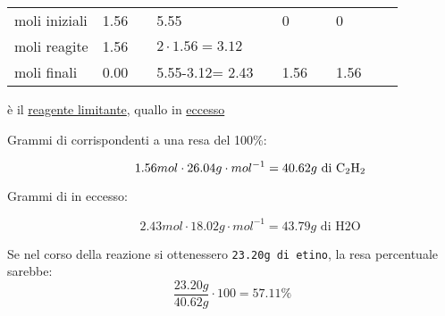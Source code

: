 \begin{ess}
\begin{tabular}[ht!]{llllllllll}
    moli iniziali & 1.56 && 5.55 && 0 && 0\\
    moli reagite & 1.56 && $2\cdot 1.56 = 3.12$\\
    moli finali & 0.00 && 5.55-3.12= 2.43 && 1.56 && 1.56
  \end{tabular}
  \begin{center}
     è il \underline{reagente limitante},  quallo in \underline{eccesso}
  \end{center}
  \begin{description}
  \item[Grammi di  corrispondenti a una resa del 100\%:]
    \begin{equation*}
      1.56mol\cdot 26.04g\cdot mol^{-1}=40.62g \text{ di \ce{C2H2}}
    \end{equation*}
    
  \item[Grammi di  in eccesso:]
    \begin{equation*}
      2.43mol\cdot 18.02g\cdot mol^{-1}=43.79g \text{ di H2O}
    \end{equation*}
  \end{description}
  Se nel corso della reazione si ottenessero {\tt 23.20g di etino}, la resa percentuale sarebbe:
  \begin{equation*}
    \frac{23.20g}{40.62g}\cdot 100 = 57.11\%
  \end{equation*}
\end{ess}
\newpage
